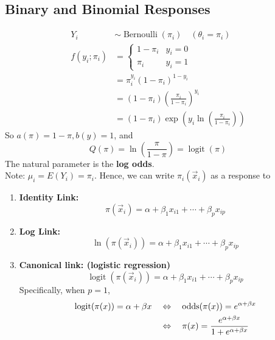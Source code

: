 \documentclass[11pt]{elegantbook}
\begin{document}
\subsection{Binary and Binomial Responses}
\begin{example}
    \begin{equation}
        \begin{aligned}
        Y_i & \sim \operatorname{Bernoulli}\left(\pi_i\right) \quad\left(\theta_i=\pi_i\right) \\
        f\left(y_i ; \pi_i\right) & = \left\{\begin{matrix}
            1-\pi_i & y_i=0 \\
            \pi_i & y_i=1
        \end{matrix}\right.\\
        & =\pi_i^{y_i}\left(1-\pi_i\right)^{1-y_i} \\
        & =\left(1-\pi_i\right)\left(\frac{\pi_i}{1-\pi_i}\right)^{y_i} \\
        & =\left(1-\pi_i\right) \exp \left(y_i \ln \left(\frac{\pi_i}{1-\pi_i}\right)\right)
        \end{aligned}
        \nonumber
    \end{equation}
    So $a(\pi)=1-\pi, b(y)=1$, and
    $$
    Q(\pi)=\ln \left(\frac{\pi}{1-\pi}\right)=\operatorname{logit}(\pi)
    $$
    The natural parameter is the \textbf{log odds}.\\
    Note: $\mu_i=E\left(Y_i\right)=\pi_i$. Hence, we can write $\pi_i(\vec{x}_i)$ as a response to
    \begin{enumerate}[$\bullet$]
        \item \textbf{Identity Link:} $$\pi(\vec{x}_i)=\alpha+\beta_1 x_{i1} + \cdots + \beta_p x_{ip}$$
        \item \textbf{Log Link:} $$\ln (\pi(\vec{x}_i))=\alpha+\beta_1 x_{i1} + \cdots + \beta_p x_{ip}$$
        \item \textbf{Canonical link: (logistic regression)}
        $$
        \operatorname{logit}(\pi(\vec{x}_i))=\alpha+\beta_1 x_{i1} + \cdots + \beta_p x_{ip}
        $$
        Specifically, when $p=1$,
        \begin{equation}
            \begin{aligned}
                \operatorname{logit}(\pi(x))=\alpha+\beta x\quad &\Leftrightarrow\quad \textnormal{odds}(\pi(x))=e^{\alpha+\beta x}\\
                &\Leftrightarrow\quad \pi(x)=\frac{e^{\alpha+\beta x}}{1+e^{\alpha+\beta x}}

\end{aligned}
\end{equation}
\end{enumerate}
\end{example}
\end{document}
